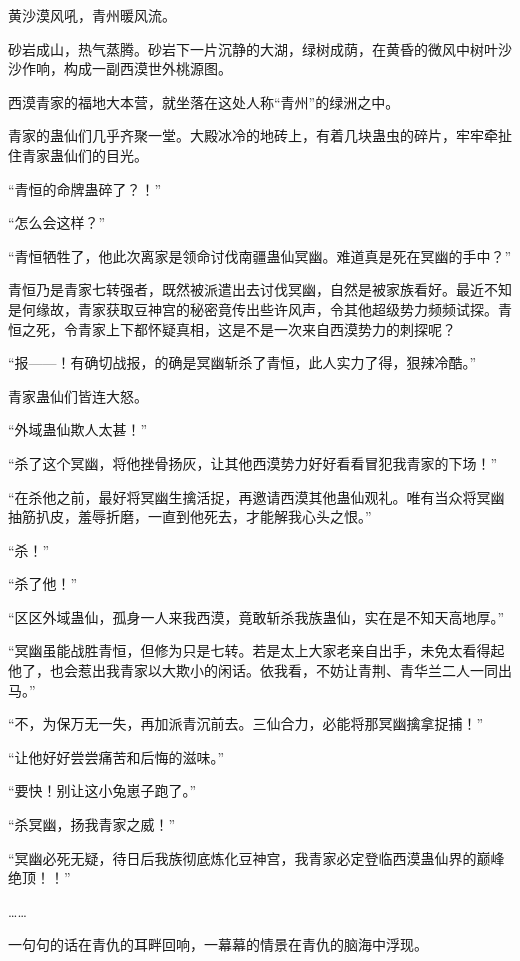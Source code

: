 
\begin{this_body}

黄沙漠风吼，青州暖风流。

砂岩成山，热气蒸腾。砂岩下一片沉静的大湖，绿树成荫，在黄昏的微风中树叶沙沙作响，构成一副西漠世外桃源图。

西漠青家的福地大本营，就坐落在这处人称“青州”的绿洲之中。

青家的蛊仙们几乎齐聚一堂。大殿冰冷的地砖上，有着几块蛊虫的碎片，牢牢牵扯住青家蛊仙们的目光。

“青恒的命牌蛊碎了？！”

“怎么会这样？”

“青恒牺牲了，他此次离家是领命讨伐南疆蛊仙冥幽。难道真是死在冥幽的手中？”

青恒乃是青家七转强者，既然被派遣出去讨伐冥幽，自然是被家族看好。最近不知是何缘故，青家获取豆神宫的秘密竟传出些许风声，令其他超级势力频频试探。青恒之死，令青家上下都怀疑真相，这是不是一次来自西漠势力的刺探呢？

“报——！有确切战报，的确是冥幽斩杀了青恒，此人实力了得，狠辣冷酷。”

青家蛊仙们皆连大怒。

“外域蛊仙欺人太甚！”

“杀了这个冥幽，将他挫骨扬灰，让其他西漠势力好好看看冒犯我青家的下场！”

“在杀他之前，最好将冥幽生擒活捉，再邀请西漠其他蛊仙观礼。唯有当众将冥幽抽筋扒皮，羞辱折磨，一直到他死去，才能解我心头之恨。”

“杀！”

“杀了他！”

“区区外域蛊仙，孤身一人来我西漠，竟敢斩杀我族蛊仙，实在是不知天高地厚。”

“冥幽虽能战胜青恒，但修为只是七转。若是太上大家老亲自出手，未免太看得起他了，也会惹出我青家以大欺小的闲话。依我看，不妨让青荆、青华兰二人一同出马。”

“不，为保万无一失，再加派青沉前去。三仙合力，必能将那冥幽擒拿捉捕！”

“让他好好尝尝痛苦和后悔的滋味。”

“要快！别让这小兔崽子跑了。”

“杀冥幽，扬我青家之威！”

“冥幽必死无疑，待日后我族彻底炼化豆神宫，我青家必定登临西漠蛊仙界的巅峰绝顶！！”

……

一句句的话在青仇的耳畔回响，一幕幕的情景在青仇的脑海中浮现。


\end{this_body}
